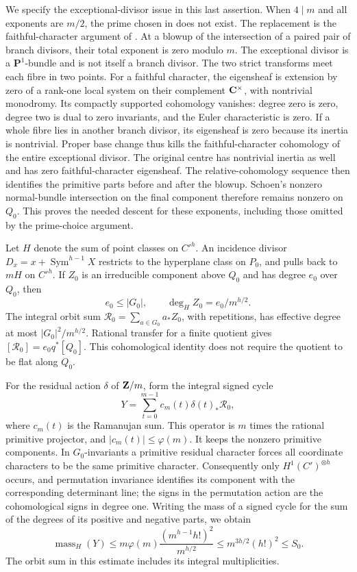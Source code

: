 We specify the exceptional-divisor issue in this last assertion.
When $4\mid m$ and all exponents are $m/2$, the prime chosen in
\cite[Sublemma~2.9, p.~19]{Schoen88} does not exist. The replacement
is the faithful-character argument of \cite[Lemma~4.4, pp.~9--10]{Severn}.
At a blowup of the intersection of a paired pair of branch divisors,
their total exponent is zero modulo $m$. The exceptional divisor is a
$\mathbf P^1$-bundle and is not itself a branch divisor. The two
strict transforms meet each fibre in two points. For a faithful
character, the eigensheaf is extension by zero of a rank-one local
system on their complement $\mathbf C^\times$, with nontrivial monodromy.
Its compactly supported cohomology vanishes: degree zero is zero,
degree two is dual to zero invariants, and the Euler characteristic is
zero. If a whole fibre lies in another branch divisor, its eigensheaf
is zero because its inertia is nontrivial. Proper base change thus
kills the faithful-character cohomology of the entire exceptional
divisor. The original centre has nontrivial inertia as well and has
zero faithful-character eigensheaf. The relative-cohomology sequence
then identifies the primitive parts before and after the blowup.
Schoen's nonzero normal-bundle intersection on the final component
therefore remains nonzero on $Q_0$. This proves the needed descent for
these exponents, including those omitted by the prime-choice argument.

Let $H$ denote the sum of point classes on $C'^h$. An incidence divisor
$D_x=x+\operatorname{Sym}^{h-1}X$ restricts to the hyperplane class on
$P_0$, and pulls back to $mH$ on $C'^h$. If $Z_0$ is an irreducible
component above $Q_0$ and has degree $e_0$ over $Q_0$, then
\[
 e_0\le |G_0|,
 \qquad \deg_H Z_0=e_0/m^{h/2}.
\]
The integral orbit sum
$\mathcal R_0=\sum_{a\in G_0}a_*Z_0$, with repetitions, has effective
degree at most $|G_0|^2/m^{h/2}$. Rational transfer for a finite
quotient gives $[\mathcal R_0]=e_0q^*[Q_0]$. This cohomological
identity does not require the quotient to be flat along $Q_0$.

For the residual action $\delta$ of $\mathbf Z/m$, form the integral signed
cycle
\[
 Y=\sum_{t=0}^{m-1}c_m(t)\delta(t)_*\mathcal R_0,
\]
where $c_m(t)$ is the Ramanujan sum. This operator is $m$ times the
rational primitive projector, and $|c_m(t)|\le\varphi(m)$. It keeps
the nonzero primitive components. In $G_0$-invariants a primitive
residual character forces all coordinate characters to be the same
primitive character. Consequently only
$H^1(C')^{\otimes h}$ occurs, and permutation invariance identifies
its component with the corresponding determinant line; the signs in
the permutation action are the cohomological signs in degree one.
Writing the mass of a signed cycle for the sum of the degrees of its
positive and negative parts, we obtain
\begin{equation}\label{eq:eis-cyclic-mass}
 \operatorname{mass}_H(Y)
 \le m\varphi(m)\frac{(m^{h-1}h!)^2}{m^{h/2}}
 \le m^{3h/2}(h!)^2\le S_0.
\end{equation}
The orbit sum in this estimate includes its integral multiplicities.

